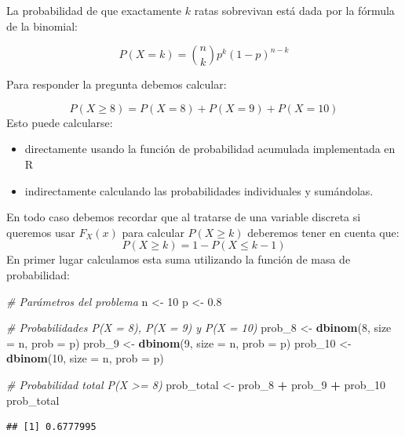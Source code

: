 \documentclass[
]{article}
\newenvironment{Shaded}{\begin{snugshade}}{\end{snugshade}}
\newcommand{\AttributeTok}[1]{\textcolor[rgb]{0.13,0.29,0.53}{#1}}
\newcommand{\CommentTok}[1]{\textcolor[rgb]{0.56,0.35,0.01}{\textit{#1}}}
\newcommand{\DecValTok}[1]{\textcolor[rgb]{0.00,0.00,0.81}{#1}}
\newcommand{\FloatTok}[1]{\textcolor[rgb]{0.00,0.00,0.81}{#1}}
\newcommand{\FunctionTok}[1]{\textcolor[rgb]{0.13,0.29,0.53}{\textbf{#1}}}
\newcommand{\NormalTok}[1]{#1}
\newcommand{\OtherTok}[1]{\textcolor[rgb]{0.56,0.35,0.01}{#1}}
\newcommand{\SpecialCharTok}[1]{\textcolor[rgb]{0.81,0.36,0.00}{\textbf{#1}}}
\providecommand{\tightlist}{%
  \setlength{\itemsep}{0pt}\setlength{\parskip}{0pt}}
\begin{document}
La probabilidad de que exactamente \(k\) ratas sobrevivan está dada por la fórmula de la binomial:

\[
P(X = k) = \binom{n}{k} p^k (1 - p)^{n-k}
\]

Para responder la pregunta debemos calcular:

\[
P(X \geq 8) = P(X = 8) + P(X = 9) + P(X = 10)
\]
Esto puede calcularse:

\begin{itemize}
\tightlist
\item
  directamente usando la función de probabilidad acumulada implementada en R
\item
  indirectamente calculando las probabilidades individuales y sumándolas.
\end{itemize}

En todo caso debemos recordar que al tratarse de una variable discreta si queremos usar \(F_X(x)\) para calcular \(P(X\geq k)\) deberemos tener en cuenta que:
\[
P(X\geq k) = 1-P(X\leq k-1)
\]
En primer lugar calculamos esta suma utilizando la función de masa de probabilidad:

\begin{Shaded}
\begin{Highlighting}[]
\CommentTok{\# Parámetros del problema}
\NormalTok{n }\OtherTok{\textless{}{-}} \DecValTok{10}
\NormalTok{p }\OtherTok{\textless{}{-}} \FloatTok{0.8}

\CommentTok{\# Probabilidades P(X = 8), P(X = 9) y P(X = 10)}
\NormalTok{prob\_8 }\OtherTok{\textless{}{-}} \FunctionTok{dbinom}\NormalTok{(}\DecValTok{8}\NormalTok{, }\AttributeTok{size =}\NormalTok{ n, }\AttributeTok{prob =}\NormalTok{ p)}
\NormalTok{prob\_9 }\OtherTok{\textless{}{-}} \FunctionTok{dbinom}\NormalTok{(}\DecValTok{9}\NormalTok{, }\AttributeTok{size =}\NormalTok{ n, }\AttributeTok{prob =}\NormalTok{ p)}
\NormalTok{prob\_10 }\OtherTok{\textless{}{-}} \FunctionTok{dbinom}\NormalTok{(}\DecValTok{10}\NormalTok{, }\AttributeTok{size =}\NormalTok{ n, }\AttributeTok{prob =}\NormalTok{ p)}

\CommentTok{\# Probabilidad total P(X \textgreater{}= 8)}
\NormalTok{prob\_total }\OtherTok{\textless{}{-}}\NormalTok{ prob\_8 }\SpecialCharTok{+}\NormalTok{ prob\_9 }\SpecialCharTok{+}\NormalTok{ prob\_10}
\NormalTok{prob\_total}
\end{Highlighting}
\end{Shaded}

\begin{verbatim}
## [1] 0.6777995
\end{verbatim}
\end{document}

